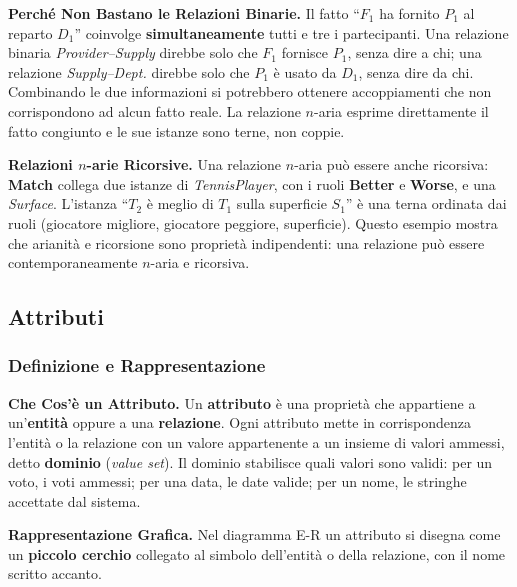 \documentclass[12pt]{extarticle}
\begin{document}
\medskip
\noindent \textbf{Perché Non Bastano le Relazioni Binarie.} Il fatto ``$F_1$ ha fornito $P_1$ al reparto $D_1$'' coinvolge \textbf{simultaneamente} tutti e tre i partecipanti. Una relazione binaria \textit{Provider--Supply} direbbe solo che $F_1$ fornisce $P_1$, senza dire a chi; una relazione \textit{Supply--Dept.} direbbe solo che $P_1$ è usato da $D_1$, senza dire da chi. Combinando le due informazioni si potrebbero ottenere accoppiamenti che non corrispondono ad alcun fatto reale. La relazione $n$-aria esprime direttamente il fatto congiunto e le sue istanze sono terne, non coppie.

\medskip
\noindent \textbf{Relazioni $n$-arie Ricorsive.} Una relazione $n$-aria può essere anche ricorsiva: \textbf{Match} collega due istanze di \textit{TennisPlayer}, con i ruoli \textbf{Better} e \textbf{Worse}, e una \textit{Surface}. L'istanza ``$T_2$ è meglio di $T_1$ sulla superficie $S_1$'' è una terna ordinata dai ruoli (giocatore migliore, giocatore peggiore, superficie). Questo esempio mostra che arianità e ricorsione sono proprietà indipendenti: una relazione può essere contemporaneamente $n$-aria e ricorsiva.

\subsection{Attributi}

\subsubsection{Definizione e Rappresentazione}

\noindent \textbf{Che Cos'è un Attributo.} Un \textbf{attributo} è una proprietà che appartiene a un'\textbf{entità} oppure a una \textbf{relazione}. Ogni attributo mette in corrispondenza l'entità o la relazione con un valore appartenente a un insieme di valori ammessi, detto \textbf{dominio} (\textit{value set}). Il dominio stabilisce quali valori sono validi: per un voto, i voti ammessi; per una data, le date valide; per un nome, le stringhe accettate dal sistema.

\medskip
\noindent \textbf{Rappresentazione Grafica.} Nel diagramma E-R un attributo si disegna come un \textbf{piccolo cerchio} collegato al simbolo dell'entità o della relazione, con il nome scritto accanto.
\end{document}
